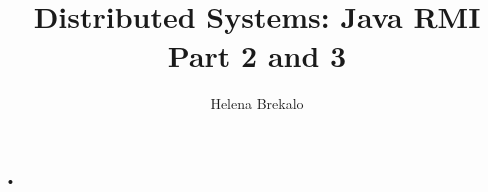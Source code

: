\documentclass[10pt,a4paper]{report}
\author{Helena Brekalo}
\title{Distributed Systems: Java RMI Part 2 and 3}
\begin{document}
•
\end{document}
